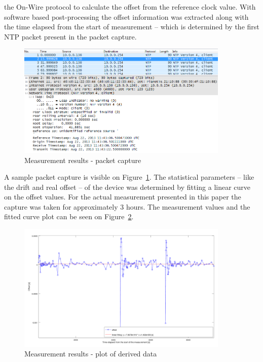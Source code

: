 \documentclass[article]{IEEEtran}
\begin{document}
the On-Wire protocol to calculate the offset from the reference clock value. With software based post-processing the
offset information was extracted along with the time elapsed from the start of measurement -- which is determined by
the
first NTP packet present in the packet capture.

\begin{figure}[!htb]
    \centering
    \includegraphics[width=0.9\textwidth]{figures_raw/pcap-NTP.png}
    \caption{Measurement results - packet capture}
    \label{fig:pcap-NTP}
\end{figure}

A sample packet capture is visible on Figure~\ref{fig:pcap-NTP}. The statistical parameters -- like the drift and real
offset -- of the device was determined by
fitting a linear curve on the offset values. For the actual measurement presented in this paper the capture was taken
for approximately 3 hours.
The measurement values and the fitted curve plot can be seen on Figure~\ref{fig:results}.

\begin{figure}[!htb]
    \centering
    \includegraphics[width=0.9\textwidth]{figures_raw/plot2.png}
    \caption{Measurement results - plot of derived data}
    \label{fig:results}
\end{figure}
\end{document}
